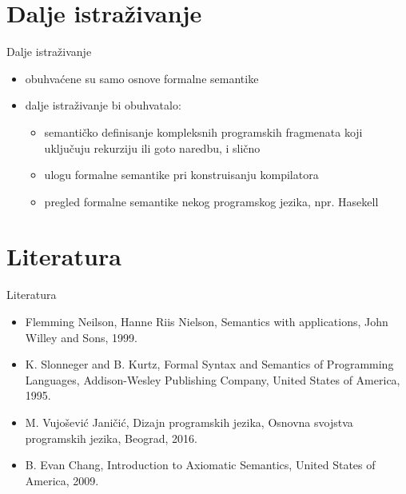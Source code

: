 \documentclass{beamer}
\begin{document}
\section{Dalje istraživanje}
\begin{frame}{Dalje istraživanje}
  \begin{itemize}
  \item obuhvaćene su samo osnove formalne semantike
  \item dalje istraživanje bi obuhvatalo:
  \begin{itemize}
  	 \item semantičko definisanje kompleksnih programskih fragmenata koji uključuju rekurziju ili goto naredbu, i slično
  	 \item ulogu formalne semantike pri konstruisanju kompilatora
  	 \item pregled formalne semantike nekog programskog jezika, npr. Hasekell
  \end{itemize}
  

  \end{itemize}
\end{frame}
\section{Literatura}
\begin{frame}{Literatura}
  \begin{itemize}
  \item Flemming Neilson, {\color{blue} Hanne Riis Nielson, Semantics with applications},
John Willey and Sons, 1999.
  \item K. Slonneger and B. Kurtz, {\color{blue}Formal Syntax and Semantics of Programming Languages}, Addison-Wesley Publishing Company, United
States of America, 1995.
  \item M. Vujošević Janičić, {\color{blue}Dizajn programskih jezika, Osnovna svojstva programskih jezika}, Beograd, 2016.
  \item B. Evan Chang, {\color{blue}Introduction to Axiomatic Semantics}, United States of America, 2009.
  \end{itemize}
\end{frame}
\end{document}
